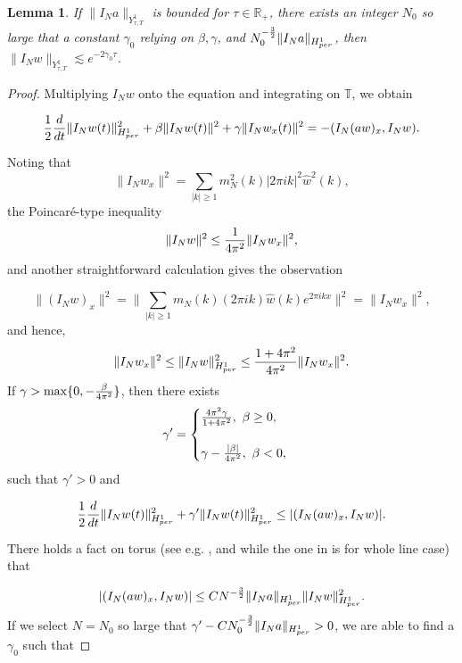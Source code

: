 \documentclass[10pt,a4paper,final]{article}
\numberwithin{equation}{section}
\newtheorem{lemma}[theorem]{Lemma}
\newcommand{\Gg}{\gamma}
\begin{document}
\begin{lemma}\label{le5-6}
If $\|I_Na\|_{Y^1_{\tau, T}}$ is bounded for $\tau\in \mathbb{R}_+$, there exists an integer $N_0$ so large that a constant $\gamma_0$ relying on $\beta, \gamma$, and  $N_0^{-{3\over 2}}\|I_Na\|_{H_{per}^1}$, then $\|I_Nw\|_{Y^1_{\tau, T}}\lesssim e^{-2\gamma_0\tau}$.
\end{lemma}
\begin{proof}
Multiplying $I_N w$ onto the equation and integrating on $\mathbb{T}$, we obtain 

\begin{eqnarray*}
{1\over 2}{d\over dt}\|I_Nw(t)\|_{H_{per}^1}^2 + \beta\|I_Nw(t)\|^2+\gamma\|I_Nw_{x}(t)\|^2=-(I_N(aw)_x, I_Nw).
\end{eqnarray*}

Noting that 
$$\|I_Nw_x\|^2 = \sum_{|k|\ge 1}m_N^2(k)|2\pi ik|^2{\hat w}^2(k),$$
the Poincaré-type inequality
$$\|I_Nw\|^2\le {1\over 4\pi^2}\|I_Nw_x\|^2,$$
and another straightforward calculation gives the observation

$$\|(I_Nw)_x\|^2=\|\sum_{|k|\ge1}m_N(k)(2\pi ik) \hat w(k)e^{2\pi ikx}\|^2=\|I_Nw_x\|^2,$$
and hence, $$\|I_Nw_x\|^2\le\|I_Nw\|_{H^1_{per}}^2\le {1+4\pi^2\over 4\pi^2}\|I_Nw_x\|^2.$$
If $\gamma >\max\{0, -{\beta\over 4\pi^2}\}$, then there exists
\begin{eqnarray*}
\Gg' = 
\begin{cases}
{4\pi^2\gamma\over 1+4\pi^2}, \,\,\beta\ge 0,\\\\
\gamma - {|\beta|\over 4\pi^2}, \,\, \beta<0,
\end{cases}
\end{eqnarray*}
such that $\Gg'>0$ and

\begin{eqnarray*}
{1\over 2}{d\over dt}\|I_Nw(t)\|_{H_{per}^1}^2 + \gamma'\|I_Nw(t)\|_{H^1_{per}}^2\le|(I_N(aw)_x, I_Nw)|.
\end{eqnarray*}

There holds a fact on torus (see e.g. \cite{MWang2}, and \cite{LW2} while the one in \cite{LW2} is for whole line case) that 

\begin{eqnarray}\label{5-7}
|(I_N(aw)_x, I_Nw)|\le CN^{-{3\over 2}}\|I_Na\|_{H_{per}^1}\|I_Nw\|^2_{H_{per}^1}.
\end{eqnarray} If we select $N=N_0$ so large that $\Gg'-CN_0^{-{3\over 2}}\|I_Na\|_{H_{per}^1}>0$, we are able to find a $\gamma_0$ such that


\end{proof}
\end{document}
